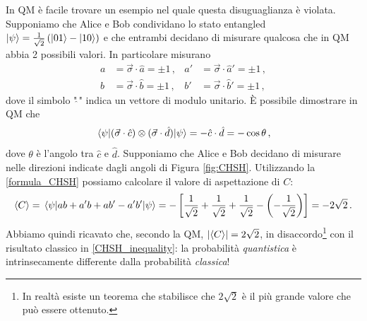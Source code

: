 \noindent In QM è facile trovare un esempio nel quale questa disuguaglianza è violata. Supponiamo che Alice e Bob condividano lo stato entangled $\ket{\psi} = \frac{1}{\sqrt{2}} \left( \ket{01} - \ket{10} \right)$ e che entrambi decidano di misurare qualcosa che in QM abbia 2 possibili valori. In particolare misurano
\begin{align*}
    a &= \vec{\sigma} \cdot \hat{a} = \pm 1 \, , &a' &= \vec{\sigma} \cdot \hat{a}' = \pm 1 \, , \\
    b &= \vec{\sigma} \cdot \hat{b} = \pm 1 \, , &b' &= \vec{\sigma} \cdot \hat{b}' = \pm 1 \, ,
\end{align*}
dove il simbolo "$\hat{\,}$" indica un vettore di modulo unitario. È possibile dimostrare in QM che
\begin{equation}\label{formula_CHSH}
    \expval{(\vec{\sigma} \cdot \hat{c}) \otimes (\vec{\sigma} \cdot \hat{d})}{\psi} = - \hat{c} \cdot \hat{d} = - \cos \theta \, ,
\end{equation}
dove $\theta$ è l'angolo tra $\hat{c}$ e $\hat{d}$. Supponiamo che Alice e Bob decidano di misurare nelle direzioni indicate dagli angoli di Figura \ref{fig:CHSH}. Utilizzando la \eqref{formula_CHSH} possiamo calcolare il valore di aspettazione di $C$:
\begin{equation*}
    \expval{C} = \expval{ab + a'b + a b' - a'b'}{\psi} = - \left[ \frac{1}{\sqrt{2}} + \frac{1}{\sqrt{2}} + \frac{1}{\sqrt{2}} - \left( -\frac{1}{\sqrt{2}} \right) \right] = -2\sqrt{2} \, .
\end{equation*}
Abbiamo quindi ricavato che, secondo la QM, $\abs{\expval{C}} = 2\sqrt{2}$, in disaccordo\footnote{In realtà esiste un teorema che stabilisce che $2\sqrt{2}$ è il più grande valore che può essere ottenuto.} con il risultato classico in \eqref{CHSH_inequality}: la probabilità \textit{quantistica} è intrinsecamente differente dalla probabilità \textit{classica}! 

